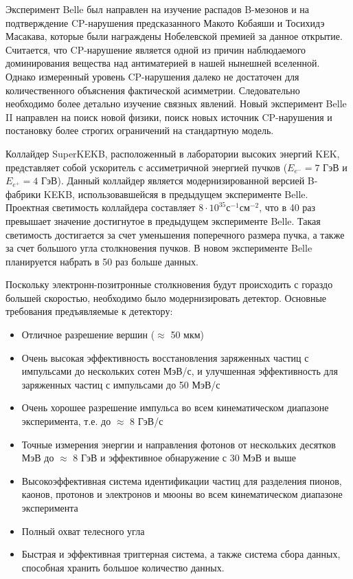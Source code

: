  Эксперимент Belle был направлен на изучение распадов B-мезонов и на подтверждение CP-нарушения предсказанного Макото Кобаяши и Тосихидэ Масакава, которые были награждены Нобелевской премией за данное открытие. Считается, что CP-нарушение является одной из причин наблюдаемого доминирования вещества над антиматерией в нашей нынешней вселенной. Однако измеренный уровень CP-нарушения далеко не достаточен для количественного объяснения фактической асимметрии. Следовательно необходимо более детально изучение связных явлений. Новый эксперимент Belle II направлен на поиск новой физики, поиск новых источник CP-нарушения и постановку более строгих ограничений на стандартную модель.\par 
Коллайдер SuperKEKB, расположенный в лаборатории высоких энергий KEK, представляет собой ускоритель с ассиметричной энергией пучков ($E_{e^-}=7$ ГэВ и $E_{e^+}=4$ ГэВ). Данный коллайдер является модернизированной версией B-фабрики KEKB, использовавшейсяя в предыдущем эксперименте Belle. Проектная светимость коллайдера составляет $8\cdot10^{35}$с$^{-1}$см$^{-2}$, что в 40 раз превышает значение достигнутое в предыдущем эксперименте Belle. Такая светимость достигается за счет уменьшения поперечного размера пучка, а также за счет большого угла столкновения пучков. В новом эксперименте Belle планируется набрать в 50 раз больше данных.\par
  Поскольку электронн-позитронные столкновения будут происходить с гораздо большей скоростью, необходимо было модернизировать детектор. Основные требования предъявляемые к детектору: 
\begin{itemize}
  \item Отличное разрешение вершин ($\approx$ 50 мкм)
  \item Очень высокая эффективность восстановления заряженных частиц с импульсами до нескольких сотен МэВ/с, и улучшенная эффективность для заряженных частиц с импульсами до 50 МэВ/с
  \item Очень хорошее разрешение импульса во всем кинематическом диапазоне эксперимента, т.е. до $\approx$ 8 ГэВ/с
  \item Точные измерения энергии и направления фотонов от нескольких десятков МэВ до $\approx$ 8 ГэВ и эффективное обнаружение с 30 МэВ и выше
  \item Высокоэффективная система идентификации частиц для разделения пионов, каонов, протонов и электронов и мюоны во всем кинематическом диапазоне эксперимента
  \item Полный охват телесного угла
  \item Быстрая и эффективная триггерная система, а также система сбора данных, способная хранить большое количество данных.
\end{itemize} \par
